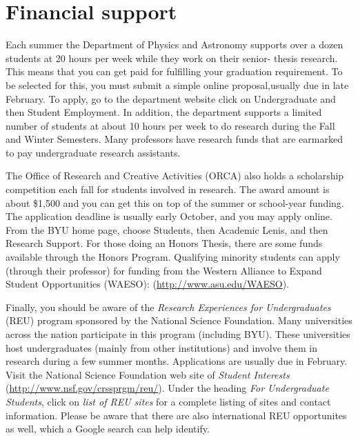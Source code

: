 \section{Financial support}
\label{sec:FinancialSupport} 

Each summer the Department of Physics and Astronomy supports over a
dozen students at 20 hours per week while they work on their senior-
thesis research. This means that you can get paid for fulfilling
your graduation requirement. To be selected for this, you must
submit a simple online proposal,usually due in late February. To
apply, go to the department website click on Undergraduate and then
Student Employment.  In addition, the department supports a limited
number of students at about 10 hours per week to do research during
the Fall and Winter Semesters. Many professors have research funds
that are earmarked to pay undergraduate research assistants.

The Office of Research and Creative Activities (ORCA) also holds a
scholarship competition each fall for students involved in research.
The award amount is about \$1,500 and you can get this on top of the
summer or school-year funding. The application deadline is usually
early October, and you may apply online. From the BYU home page,
choose Students, then Academic Lenis, and then Research Support. For
those doing an Honors Thesis, there are some funds available through
the Honors Program. Qualifying minority students can apply (through
their professor) for funding from the Western Alliance to Expand
Student Opportunities (WAESO): (\href{http://www.asu.edu/WAESO}
{\url{http://www.asu.edu/WAESO}}).

Finally, you should be aware of the \emph{Research Experiences for
Undergraduates} (REU) program sponsored by the National Science
Foundation. Many universities across the nation participate in this
program (including BYU). These universities host undergraduates
(mainly from other institutions) and involve them in research during
a few summer months. Applications are usually due in February. Visit
the National Science Foundation web site of \emph{Student Interests}
(\href{http://www.nsf.gov/crssprgm/reu/}{\url{http://www.nsf.gov/crssprgm/reu/}}).
Under the heading \emph{For Undergraduate Students}, click on
\emph{list of REU sites} for a complete listing of sites and contact
information.  Please be aware that there are also international REU
opportunites as well, which a Google search can help identify.

